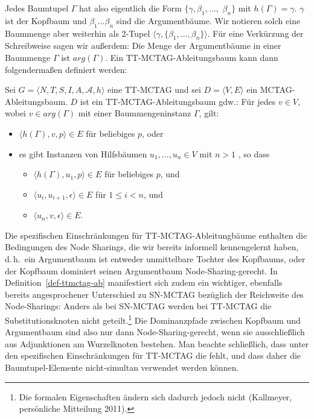 Jedes Baumtupel $\Gamma$ hat also eigentlich die Form $\{ \gamma, \beta_1,\ldots,$ $\beta_n\}$ mit $h(\Gamma) = \gamma$. $\gamma$ ist der Kopfbaum und $\beta_1 \ldots \beta_n$ sind die Argumentbäume. Wir notieren solch eine Baummenge aber weiterhin als 2-Tupel $\langle \gamma, \{\beta_1, \ldots, \beta_n\} \rangle$. Für eine Verkürzung der Schreibweise sagen wir außerdem: Die Menge der Argumentbäume in einer Baummenge $\Gamma$ ist $arg(\Gamma)$. Ein TT-MCTAG-Ableitungsbaum kann dann folgenderma\ss en definiert werden:
\begin{definition}\label{def-ttmctag-ab}
Sei $G = \langle N,T,S,I,A,\mathcal{A},h \rangle$ eine TT-MC\-TAG und sei $D = \langle V,E \rangle$ ein MCTAG-Ableitungsbaum. $D$ ist ein TT-MCTAG-Ablei\-tungs\-baum gdw.:
Für jedes $v \in V$, wobei $v \in arg(\Gamma)$ mit einer Baummengeninstanz $\Gamma$, gilt:
\begin{itemize} 
  \item $\langle h(\Gamma),v,p \rangle \in E$ für beliebiges $p$, oder
  \item es gibt Instanzen von Hilfsbäumen $u_1, \ldots, u_n \in V$ mit $n>1$ , so dass
  \begin{itemize}
    \item $\langle h(\Gamma),u_1,p \rangle \in E$ für beliebiges $p$, und
    \item $\langle u_i,u_{i+1},\epsilon \rangle \in E$ für $1 \leq i < n$, und
    \item $\langle u_n,v,\epsilon \rangle \in E$.
  \end{itemize}
\end{itemize}  
\end{definition}
Die spezifischen Einschränkungen für TT-MCTAG-Ableitungbäume enthalten die Bedingungen des Node Sharings, die wir bereits informell kennengelernt haben, d.\,h.\ ein Argumentbaum ist entweder unmittelbare Tochter des Kopfbaums, oder der Kopfbaum dominiert seinen Argumentbaum Node-Sharing-gerecht. In Definition~\ref{def-ttmctag-ab} manifestiert sich zudem ein wichtiger, ebenfalls bereits angesprochener Unterschied zu SN-MCTAG \citep{Kallmeyer:05,Kallmeyer:09} bezüglich der Reichweite des Node-Sharings: Anders als bei SN-MCTAG werden bei TT-MCTAG die Substitutionsknoten nicht geteilt.\footnote{Die formalen Eigenschaften ändern sich dadurch jedoch nicht (Kallmeyer, persönliche Mitteilung 2011).} Die Dominanzpfade zwischen Kopfbaum und Argumentbaum sind also nur dann Node-Sharing-gerecht, wenn sie ausschlie\ss lich aus Adjunktionen am Wurzelknoten bestehen.
Man beachte schlie\ss lich, dass unter den spezifischen Einschränkungen für TT-MCTAG die  fehlt, und dass daher die Baumtupel-Elemente nicht-simultan verwendet werden können.

